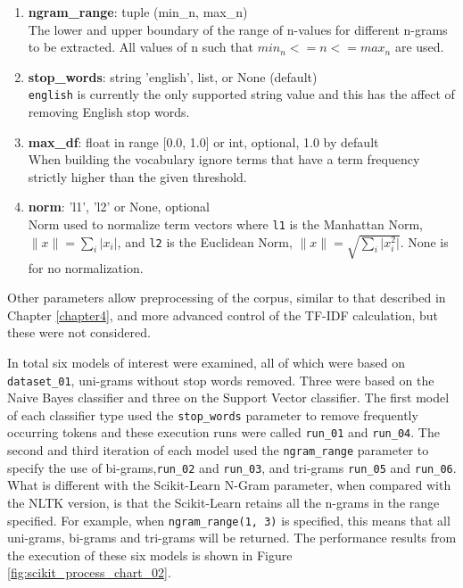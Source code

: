 \begin{enumerate}

	\item \textbf{ngram\_range}: tuple (min\_n, max\_n) \\
	The lower and upper boundary of the range of n-values for different n-grams to be extracted. All values of n such that $min_n <= n <= max_n$ are used.
	
	\item \textbf{stop\_words}: string {'english'}, list, or None (default) \\
	\verb|english| is currently the only supported string value and this has the affect of removing English stop words.
	
	\item \textbf{max\_df}: float in range [0.0, 1.0] or int, optional, 1.0 by default \\
	When building the vocabulary ignore terms that have a term frequency strictly higher than the given threshold.
	
	\item \textbf{norm}: 'l1', 'l2' or None, optional \\
	Norm used to normalize term vectors where \verb|l1| is the Manhattan Norm, $\lVert{x}\rVert = \sum_i \lvert x_i \rvert$, and \verb|l2| is the Euclidean Norm, $\lVert{x}\rVert = \sqrt{\sum_i \lvert x_i^2 \rvert}$. None is for no normalization.
	

\end{enumerate}

Other parameters allow preprocessing of the corpus, similar to that described in Chapter \ref{chapter4}, and more advanced control of the TF-IDF calculation, but these were not considered.

In total six models of interest were examined, all of which were based on \verb|dataset_01|, uni-grams without stop words removed. Three were based on the Naive Bayes classifier and three on the Support Vector classifier. The first model of each classifier type used the \verb|stop_words| parameter to remove frequently occurring tokens and these execution runs were called \verb|run_01| and \verb|run_04|. The second and third iteration of each model used the \verb|ngram_range| parameter to specify the use of bi-grams,\verb|run_02| and \verb|run_03|, and tri-grams \verb|run_05| and \verb|run_06|. What is different with the Scikit-Learn N-Gram parameter, when compared with the NLTK version, is that the Scikit-Learn retains all the n-grams in the range specified. For example, when \verb|ngram_range(1, 3)| is specified, this means that all uni-grams, bi-grams and tri-grams will be returned. The performance results from the execution of these six models is shown in Figure \ref{fig:scikit_process_chart_02}.

